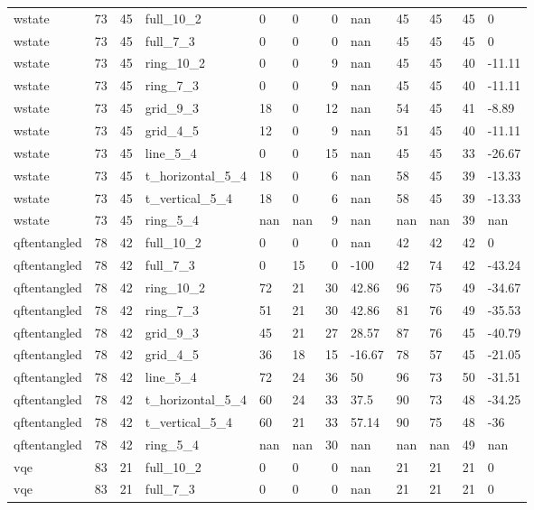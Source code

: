 \begin{longtable}{lrrlllrlllrl}
wstate & 73 & 45 & full\_10\_2 & 0 & 0 & 0 & nan & 45 & 45 & 45 & 0 \\
wstate & 73 & 45 & full\_7\_3 & 0 & 0 & 0 & nan & 45 & 45 & 45 & 0 \\
wstate & 73 & 45 & ring\_10\_2 & 0 & 0 & 9 & nan & 45 & 45 & 40 & -11.11 \\
wstate & 73 & 45 & ring\_7\_3 & 0 & 0 & 9 & nan & 45 & 45 & 40 & -11.11 \\
wstate & 73 & 45 & grid\_9\_3 & 18 & 0 & 12 & nan & 54 & 45 & 41 & -8.89 \\
wstate & 73 & 45 & grid\_4\_5 & 12 & 0 & 9 & nan & 51 & 45 & 40 & -11.11 \\
wstate & 73 & 45 & line\_5\_4 & 0 & 0 & 15 & nan & 45 & 45 & 33 & -26.67 \\
wstate & 73 & 45 & t\_horizontal\_5\_4 & 18 & 0 & 6 & nan & 58 & 45 & 39 & -13.33 \\
wstate & 73 & 45 & t\_vertical\_5\_4 & 18 & 0 & 6 & nan & 58 & 45 & 39 & -13.33 \\
wstate & 73 & 45 & ring\_5\_4 & nan & nan & 9 & nan & nan & nan & 39 & nan \\
qftentangled & 78 & 42 & full\_10\_2 & 0 & 0 & 0 & nan & 42 & 42 & 42 & 0 \\
qftentangled & 78 & 42 & full\_7\_3 & 0 & 15 & 0 & -100 & 42 & 74 & 42 & -43.24 \\
qftentangled & 78 & 42 & ring\_10\_2 & 72 & 21 & 30 & 42.86 & 96 & 75 & 49 & -34.67 \\
qftentangled & 78 & 42 & ring\_7\_3 & 51 & 21 & 30 & 42.86 & 81 & 76 & 49 & -35.53 \\
qftentangled & 78 & 42 & grid\_9\_3 & 45 & 21 & 27 & 28.57 & 87 & 76 & 45 & -40.79 \\
qftentangled & 78 & 42 & grid\_4\_5 & 36 & 18 & 15 & -16.67 & 78 & 57 & 45 & -21.05 \\
qftentangled & 78 & 42 & line\_5\_4 & 72 & 24 & 36 & 50 & 96 & 73 & 50 & -31.51 \\
qftentangled & 78 & 42 & t\_horizontal\_5\_4 & 60 & 24 & 33 & 37.5 & 90 & 73 & 48 & -34.25 \\
qftentangled & 78 & 42 & t\_vertical\_5\_4 & 60 & 21 & 33 & 57.14 & 90 & 75 & 48 & -36 \\
qftentangled & 78 & 42 & ring\_5\_4 & nan & nan & 30 & nan & nan & nan & 49 & nan \\
vqe & 83 & 21 & full\_10\_2 & 0 & 0 & 0 & nan & 21 & 21 & 21 & 0 \\
vqe & 83 & 21 & full\_7\_3 & 0 & 0 & 0 & nan & 21 & 21 & 21 & 0 \\

\end{longtable}
